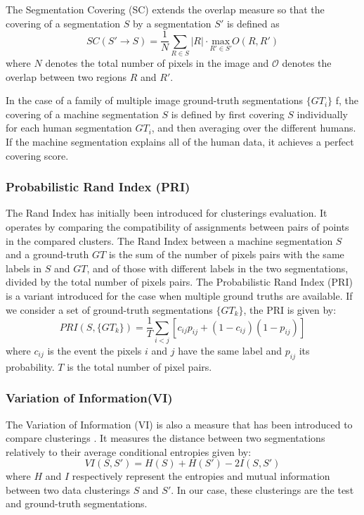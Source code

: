 \documentclass[journal]{IEEEtran}
\begin{document}
The Segmentation Covering (SC) extends the overlap measure so that the covering of a segmentation $S$ by a segmentation $S'$ is defined as 
\begin{equation}
	SC(S' \rightarrow S) = \frac{1}{N}\sum_{R \in S} |R| \cdot \underset{R' \in S'}{\mathrm{max}} O(R, R')
\end{equation}
where $N$ denotes the total number of pixels in the image and $\mathcal{O}$ denotes the overlap between two regions $R$ and $R'$.

In the case of a family of multiple image ground-truth segmentations $\{GT_i\}$ f, the covering of a machine segmentation $S$ is defined by first covering $S$ individually for each human segmentation $GT_i$, and then averaging over the different humans. If the machine segmentation explains all of the human data, it achieves a perfect covering score.

\subsubsection{Probabilistic Rand Index (PRI)}
The Rand Index has initially been introduced for clusterings evaluation. It operates by comparing the compatibility of assignments between pairs of points in the compared clusters. The Rand Index between a machine segmentation $S$ and a ground-truth $GT$ is the sum of the number of pixels pairs with the same labels in $S$ and $GT$, and of those with different labels in the two segmentations, divided by the total number of pixels pairs. The Probabilistic Rand Index (PRI) \cite{Unnikrishnan.Pantofaru.ea:CVPR:2005} is a variant introduced for the case when multiple ground truths are available. If we consider a set of ground-truth segmentations $\{GT_k\}$, the PRI is given by:
\begin{equation}
	PRI(S, \{GT_k\}) = \frac{1}{T}\sum_{i<j} [c_{ij}p_{ij} + (1-c_{ij})(1-p_{ij})]
\end{equation}
where $c_{ij}$ is the event the pixels $i$ and $j$ have the same label and $p_{ij}$ its probability. $T$ is the total number of pixel pairs.

\subsubsection{Variation of Information(VI)}
The Variation of Information (VI) is also a measure that has been introduced to compare clusterings \cite{Meila:LTKM:2003}. It measures the distance between two segmentations relatively to their average conditional entropies given by:
\begin{equation}
	VI(S, S') = H(S) + H(S') - 2I(S, S')
\end{equation}
where $H$ and $I$ respectively represent the entropies and mutual information between two data clusterings $S$ and $S'$. In our case, these clusterings are the test and ground-truth segmentations.
\end{document}
